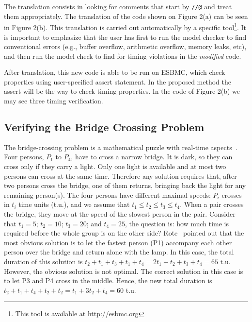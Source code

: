 \documentclass{llncs}
\begin{document}
The translation consists in looking for comments that start by {\tt //@} and treat them appropriately. 
The translation of the code shown on Figure 2(a)  
can be seen in Figure 2(b).
This translation is carried out automatically by a specific tool\footnote{This tool is available at http://esbmc.org}. 
It is important to emphasize that the user has first to run the model checker to find conventional errors 
(e.g., buffer overflow, arithmetic overflow, memory leaks, etc), 
and then run the model check to find for timing violations in the {\it modified} code.

After translation, this new code is able to be run on ESBMC, which 
check properties using user-specified assert statement.
In the proposed method the assert will be the way to check timing properties.
In the code of Figure 2(b) we may see three timing verification.


\subsection{Verifying the Bridge Crossing Problem}
\label{section:toy_example}

The bridge-crossing problem is a mathematical puzzle with real-time aspects~\cite{Rote02}. 
Four persons, $P_1$ to $P_4$, have to cross a narrow bridge.
It is dark, so they can cross only if they carry a light. 
Only one light is available and at most two persons can cross at the same time. 
Therefore any solution requires that, after two persons cross the bridge, 
one of them returns, bringing back the light for any remaining person(s). 
The four persons have different maximal speeds: 
$P_i$ crosses in $t_i$ time units (t.u.), 
and we assume that $t_1\leq t_2\leq t_3\leq t_4$.
When a pair crosses the bridge, they move at the speed of the slowest person in the pair. 
Consider that $t_1=5$; $t_2=10$; $t_3=20$; and $t_4=25$, 
the question is: how much time is required before the whole group is on the other side?
Rote~\cite{Rote02} pointed out that the most obvious solution is to let the 
fastest person (P1) accompany each other
person over the bridge and return alone with the lamp. 
In this case, the total duration of this solution is
$t_2+t_1+t_3+t_1+t_4=2t_1+t_2+t_3+t_4=65$ t.u.
However, the obvious solution is not optimal. 
The correct solution in this case is to let P3 and P4 cross in the middle.
Hence, the new total duration is
$t_2+t_1+t_4+t_2+t_2=t_1+3t_2+t_4=60$ t.u.
\end{document}
